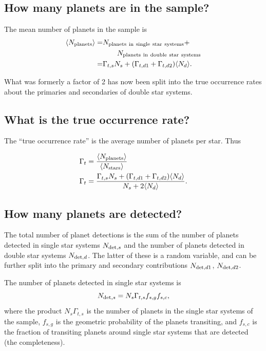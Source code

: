\documentclass{emulateapj}
\begin{document}
\subsection{How many planets are in the sample?}

The mean number of planets in the sample is
\begin{align}
\langle N_{\rm planets} \rangle
=& N_{\rm planets\ in\ single\ star\ systems}  +  \\
&\quad\quad N_{\rm planets\ in\ double\ star\ systems} 
\nonumber \\
=& \Gamma_{t,s} N_s + (\Gamma_{t,d1} + \Gamma_{t,d2}) \langle N_d \rangle.
\end{align}

What was formerly a factor of 2 has now been split into the true occurrence 
rates about the primaries and secondaries of double star systems.

\subsection{What is the true occurrence rate?}

The ``true occurrence rate'' is the average number of planets per star. Thus

\begin{align}
\Gamma_t &= \frac{\langle N_{\rm planets}\rangle}{\langle N_{\rm stars} 
\rangle} \\
\Gamma_t &= \frac{\Gamma_{t,s} N_s + (\Gamma_{t,d1} + \Gamma_{t,d2}) \langle 
N_d\rangle}{N_s +	2\langle N_d\rangle}.
\label{eq:true_occ_2}
\end{align}



\subsection{How many planets are detected?}

The total number of planet detections is the sum of the number of planets 
detected in single star systems $N_{{\rm det},s}$ and the number of planets 
detected in double star systems $N_{{\rm det},d}$.
The latter of these is a random variable, and can be further split into the 
primary and secondary contributions $N_{{\rm det},d1}$, $N_{{\rm det},d2}$.

The number of planets detected in single star systems is
\begin{equation}
N_{{\rm det},s} = N_s \Gamma_{t,s} f_{s,g} f_{s,c},
\end{equation}
where the product $N_s \Gamma_{t,s}$ is the number of planets in the single 
star systems of the sample, $f_{s,g}$ is the geometric probability of the 
planets transiting, and $f_{s,c}$ is the fraction of transiting planets around 
single star systems that are detected (the completeness).
\end{document}
